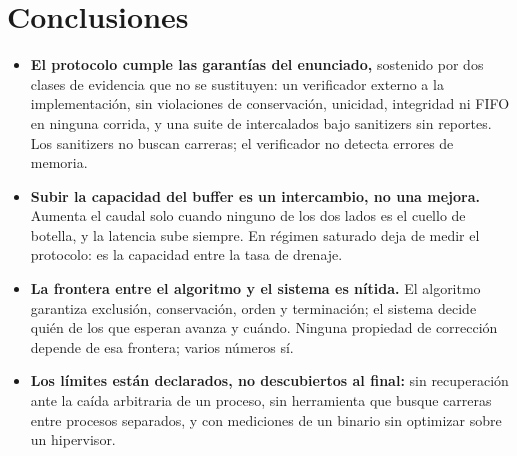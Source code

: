 \section{Conclusiones}
\label{sec:conclusiones}

\begin{itemize}
\item \textbf{El protocolo cumple las garantías del enunciado,} sostenido
      por dos clases de evidencia que no se sustituyen: un verificador
      externo a la implementación, sin violaciones de conservación,
      unicidad, integridad ni FIFO en ninguna corrida, y una suite de
      intercalados bajo sanitizers sin reportes. Los sanitizers no buscan
      carreras; el verificador no detecta errores de memoria.

\item \textbf{Subir la capacidad del buffer es un intercambio, no una
      mejora.} Aumenta el caudal solo cuando ninguno de los dos lados es el
      cuello de botella, y la latencia sube siempre. En régimen saturado
      deja de medir el protocolo: es la capacidad entre la tasa de drenaje.

\item \textbf{La frontera entre el algoritmo y el sistema es nítida.} El
      algoritmo garantiza exclusión, conservación, orden y terminación; el
      sistema decide quién de los que esperan avanza y cuándo. Ninguna
      propiedad de corrección depende de esa frontera; varios números sí.

\item \textbf{Los límites están declarados, no descubiertos al final:} sin
      recuperación ante la caída arbitraria de un proceso, sin herramienta
      que busque carreras entre procesos separados, y con mediciones de un
      binario sin optimizar sobre un hipervisor.
\end{itemize}
